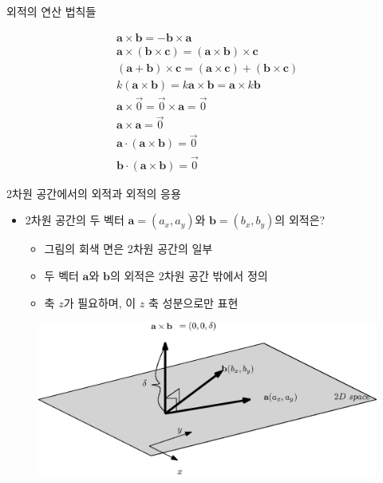 \begin{frame}{외적의 연산 법칙들}

\begin{eqnarray}\nonumber
\mathbf a \times \mathbf b = - \mathbf b \times \mathbf a \\ \nonumber
\mathbf a \times ( \mathbf b \times \mathbf c) = (\mathbf a \times \mathbf b) \times \mathbf c \\ \nonumber
(\mathbf a + \mathbf b ) \times \mathbf c = (\mathbf a \times \mathbf c) + (\mathbf b \times \mathbf c) \\ \nonumber
k(\mathbf a \times \mathbf b) = k \mathbf a \times \mathbf b = \mathbf a \times k \mathbf b \\ \nonumber
\mathbf a \times \vec{0} = \vec{0} \times \mathbf a = \vec{0} \\ \nonumber
\mathbf a \times \mathbf a = \vec{0} \\ \nonumber
\mathbf a \cdot (  \mathbf a \times \mathbf b) = \vec{0} \\ \nonumber
\mathbf b \cdot ( \mathbf a \times \mathbf b) = \vec{0}
\end{eqnarray}

\end{frame}


\begin{frame}{2차원 공간에서의 외적과 외적의 응용}

\begin{itemize}
\item 2차원 공간의 두 벡터 $\mathbf a=(a_x, a_y)$와 $\mathbf b=(b_x, b_y)$의 외적은?
	\begin{itemize}
	\item 그림의 회색 면은 2차원 공간의 일부
	\item 두 벡터 $\mathbf a$와 $\mathbf b$의 외적은 2차원 공간 밖에서 정의
	\item 축 $z$가 필요하며, 이 $z$ 축 성분으로만 표현
	\end{itemize}
\end{itemize}

\begin{figure}
\includegraphics[width=12cm]{Math_vector/crossProduct2D.eps}
\end{figure}

\end{frame}


